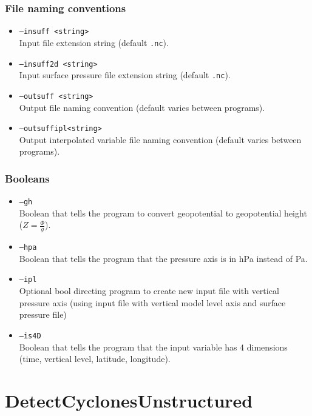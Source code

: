\documentclass{article}
\begin{document}
\subsubsection{File naming conventions}
\begin{itemize}
\item[]\texttt{--insuff <string>}\\Input file extension string (default \texttt{.nc}).
\item[]\texttt{--insuff2d <string>}\\Input surface pressure file extension string (default \texttt{.nc}).
\item[]\texttt{--outsuff <string>}\\Output file naming convention (default varies between programs).
\item[] \texttt{--outsuffipl<string>}\\Output interpolated variable file naming convention (default varies between programs).
\end{itemize}

\subsubsection{Booleans}
\begin{itemize}
\item[] \texttt{--gh}\\Boolean that tells the program to convert geopotential to geopotential height ($Z=\frac{\Phi}{g}$).
\item[] \texttt{--hpa}\\Boolean that tells the program that the pressure axis is in hPa instead of Pa.
\item[]\texttt{--ipl}\\ Optional bool directing program to create new input file with vertical pressure axis (using input file with vertical model level axis and surface pressure file)
\item[] \texttt{--is4D}\\Boolean that tells the program that the input variable has 4 dimensions (time, vertical level, latitude, longitude).
\end{itemize}

\section{DetectCyclonesUnstructured}
\end{document}
